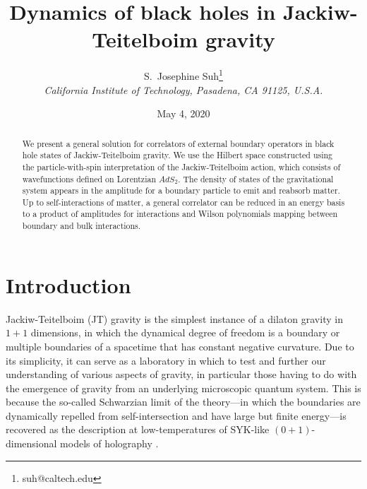 \documentclass[12pt]{article}
\title {Dynamics of black holes in Jackiw-Teitelboim gravity}
\author{S.\ Josephine Suh\footnote{suh@caltech.edu}\\
\normalsize\it California Institute of Technology, Pasadena, CA 91125, U.S.A.\vspace{0.5cm}}
\date{May 4, 2020}
\DeclareMathOperator{\AdS}{AdS}
\def\AdS{AdS}
\begin{document}
\setcounter{tocdepth}{2}

\maketitle
\thispagestyle{empty}

\begin{abstract}
We present a general solution for correlators of external boundary operators in black hole states of Jackiw-Teitelboim gravity. We use the Hilbert space constructed using the particle-with-spin interpretation of the Jackiw-Teitelboim action, which consists of wavefunctions defined on Lorentzian $\AdS_2$. The density of states of the gravitational system appears in the amplitude for a boundary particle to emit and reabsorb matter. Up to self-interactions of matter, a general correlator can be reduced in an energy basis to a product of amplitudes for interactions and Wilson polynomials mapping between boundary and bulk interactions. 

\end{abstract}


\newpage
{}
\tableofcontents
\newpage

\section{Introduction}

Jackiw-Teitelboim (JT) gravity \cite{Ja85, Te83, AlPo14} is the simplest instance of a dilaton gravity in $1+1$ dimensions, in which the dynamical degree of freedom is a boundary or multiple boundaries of a spacetime that has constant negative curvature. Due to its simplicity, it can serve as a laboratory in which to test and further our understanding of various aspects of gravity, in particular those having to do with the emergence of gravity from an underlying microscopic quantum system. This is because the so-called Schwarzian limit of the theory---in which the boundaries are dynamically repelled from self-intersection and have large but finite energy---is recovered as the description at low-temperatures of SYK-like $(0+1)$-dimensional models of holography \cite{SaYe93,Kit.KITP,SoftMode}.
\end{document}
